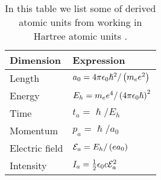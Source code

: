        \begin{table}
            \centering
            \caption{In this table we list some of derived atomic units from
            working in Hartree atomic units \cite{wiki:units,
            joachain2012atoms}.}
            \renewcommand{\arraystretch}{1.3}
            \begin{tabular}{@{}ll@{}}
                \toprule
                Dimension & Expression
                \\
                \midrule
                Length
                &
                $a_0 = 4\pi\epsilon_0\hslash^2/\left( m_e e^2 \right)$
                \\
                Energy
                &
                $E_h = m_e e^4/\left( 4\pi \epsilon_0 \hslash \right)^2$
                \\
                Time
                &
                $t_a = \hslash/E_h$
                \\
                Momentum
                &
                $p_a = \hslash/a_0$
                \\
                Electric field
                &
                $\mathcal{E}_a = E_h/\left( e a_0 \right)$
                \\
                Intensity
                &
                $I_a = \frac{1}{2}\epsilon_0 c \mathcal{E}^2_a$
                \\
                \bottomrule
            \end{tabular}
            \label{tab:atomic-units}
        \end{table}
